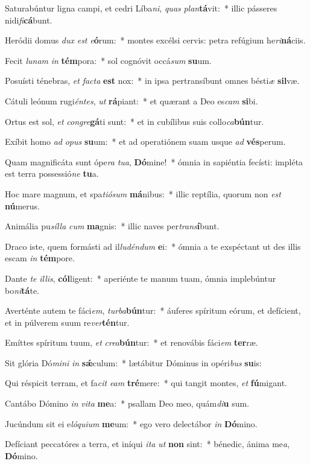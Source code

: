 \item Saturabúntur ligna campi, et cedri Líba\textit{ni}, \textit{quas} \textit{plan}\textbf{tá}vit:~* illic pásseres nidi\textit{fi}\textbf{cá}bunt.
\item Heródii domus \textit{dux} \textit{est} \textit{e}\textbf{ó}rum:~* montes excélsi cervis: petra refúgium he\textit{ri}\textbf{ná}ciis.
\item Fecit \textit{lu}\textit{nam} \textit{in} \textbf{tém}pora:~* sol cognóvit occá\textit{sum} \textbf{su}um.
\item Posuísti ténebras, \textit{et} \textit{fac}\textit{ta} \textbf{est} nox:~* in ipsa pertransíbunt omnes bésti\textit{æ} \textbf{sil}væ.
\item Cátuli leónum rugi\textit{én}\textit{tes}, \textit{ut} \textbf{rá}piant:~* et quærant a Deo es\textit{cam} \textbf{si}bi.
\item Ortus est sol, \textit{et} \textit{con}\textit{gre}\textbf{gá}ti sunt:~* et in cubílibus suis collo\textit{ca}\textbf{bún}tur.
\item Exíbit homo \textit{ad} \textit{o}\textit{pus} \textbf{su}um:~* et ad operatiónem suam usque \textit{ad} \textbf{vés}perum.
\item Quam magnificáta sunt ópe\textit{ra} \textit{tu}\textit{a}, \textbf{Dó}mine!~* ómnia in sapiéntia fecísti: impléta est terra possessió\textit{ne} \textbf{tu}a.
\item Hoc mare magnum, et spa\textit{ti}\textit{ó}\textit{sum} \textbf{má}nibus:~* illic reptília, quorum non \textit{est} \textbf{nú}merus.
\item Animália pu\textit{síl}\textit{la} \textit{cum} \textbf{ma}gnis:~* illic naves per\textit{trans}\textbf{í}bunt.
\item Draco iste, quem formásti ad il\textit{lu}\textit{dén}\textit{dum} \textbf{e}i:~* ómnia a te exspéctant ut des illis escam \textit{in} \textbf{tém}pore.
\item Dante \textit{te} \textit{il}\textit{lis}, \textbf{cól}ligent:~* aperiénte te manum tuam, ómnia implebúntur bo\textit{ni}\textbf{tá}te.
\item Averténte autem te fáci\textit{em}, \textit{tur}\textit{ba}\textbf{bún}tur:~* áuferes spíritum eórum, et defícient, et in púlverem suum re\textit{ver}\textbf{tén}tur.
\item Emíttes spíritum tuum, \textit{et} \textit{cre}\textit{a}\textbf{bún}tur:~* et renovábis fáci\textit{em} \textbf{ter}ræ.
\item Sit glória Dó\textit{mi}\textit{ni} \textit{in} \textbf{sǽ}culum:~* lætábitur Dóminus in opéri\textit{bus} \textbf{su}is:
\item Qui réspicit terram, et fa\textit{cit} \textit{e}\textit{am} \textbf{tré}mere:~* qui tangit montes, \textit{et} \textbf{fú}migant.
\item Cantábo Dómino \textit{in} \textit{vi}\textit{ta} \textbf{me}a:~* psallam Deo meo, quám\textit{di}\textbf{u} sum.
\item Jucúndum sit ei e\textit{ló}\textit{qui}\textit{um} \textbf{me}um:~* ego vero delectábor \textit{in} \textbf{Dó}mino.
\item Defíciant peccatóres a terra, et iníqui \textit{i}\textit{ta} \textit{ut} \textbf{non} sint:~* bénedic, ánima me\textit{a}, \textbf{Dó}mino.
